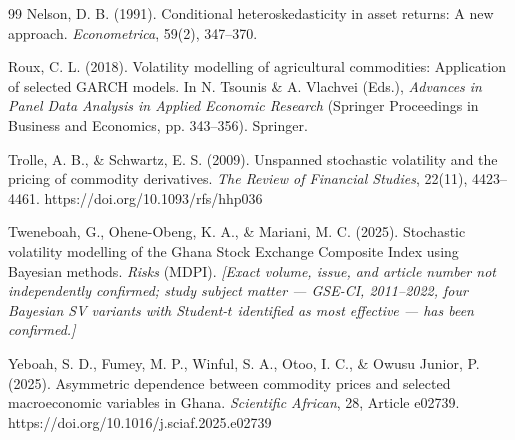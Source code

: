\documentclass[preprint,12pt,authoryear]{elsarticle}
\begin{document}
\begin{thebibliography}{99}
Nelson, D. B. (1991). Conditional heteroskedasticity in asset returns: A new approach. \textit{Econometrica}, 59(2), 347--370.

Roux, C. L. (2018). Volatility modelling of agricultural commodities: Application of selected GARCH models. In N. Tsounis \& A. Vlachvei (Eds.), \textit{Advances in Panel Data Analysis in Applied Economic Research} (Springer Proceedings in Business and Economics, pp. 343--356). Springer.

Trolle, A. B., \& Schwartz, E. S. (2009). Unspanned stochastic volatility and the pricing of commodity derivatives. \textit{The Review of Financial Studies}, 22(11), 4423--4461. https://doi.org/10.1093/rfs/hhp036

Tweneboah, G., Ohene-Obeng, K. A., \& Mariani, M. C. (2025). Stochastic volatility modelling of the Ghana Stock Exchange Composite Index using Bayesian methods. \textit{Risks} (MDPI). \emph{[Exact volume, issue, and article number not independently confirmed; study subject matter --- GSE-CI, 2011--2022, four Bayesian SV variants with Student-$t$ identified as most effective --- has been confirmed.]}

Yeboah, S. D., Fumey, M. P., Winful, S. A., Otoo, I. C., \& Owusu Junior, P. (2025). Asymmetric dependence between commodity prices and selected macroeconomic variables in Ghana. \textit{Scientific African}, 28, Article e02739. https://doi.org/10.1016/j.sciaf.2025.e02739

\end{thebibliography}
\end{document}
